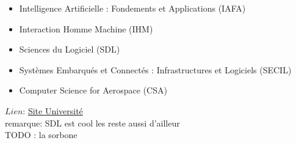 \documentclass[a4paper,11pt]{article}
\begin{document}
\begin{enumerate}
                    \begin{itemize}
                        \item Intelligence Artificielle : Fondements et Applications (IAFA)
                        \item Interaction Homme Machine (IHM)
                        \item Sciences du Logiciel (SDL)
                        \item Systèmes Embarqués et Connectés : Infrastructures et Logiciels (SECIL)
                        \item Computer Science for Aerospace (CSA)
                    \end{itemize}
                    $Lien$: \href{https://departement-informatique.univ-tlse3.fr/master/master-informatique-2021-2026/}{Site Université}
                    \\ remarque: SDL est cool les reste aussi d'ailleur
\\TODO : la sorbone

    \end{enumerate}
\end{document}
